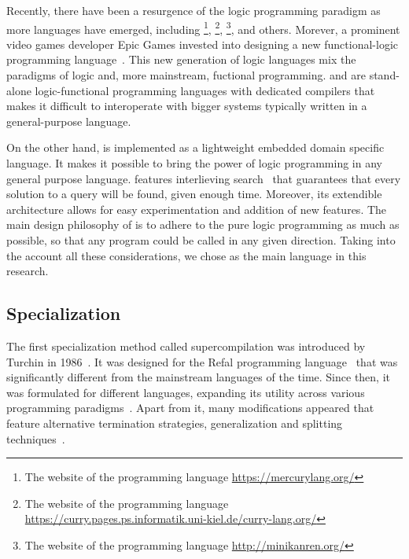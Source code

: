 Recently, there have been a resurgence of the logic programming paradigm as more  languages have emerged, including \merc\footnote{The website of the \merc programming language \url{https://mercurylang.org/}}, \curry\footnote{The website of the \curry programming language \url{https://curry.pages.ps.informatik.uni-kiel.de/curry-lang.org/}}, \mk\footnote{The website of the \mk programming language \url{http://minikanren.org/}}, and others.
Morever, a prominent video games developer Epic Games invested into designing a new functional-logic programming language~\cite{versecalculus}.
This new generation of logic languages mix the paradigms of logic and, more mainstream, fuctional programming. 
\merc and \curry are stand-alone logic-functional programming languages with dedicated compilers that makes it difficult to interoperate with bigger systems typically written in a general-purpose language. 

On the other hand, \mk is implemented as a lightweight embedded domain specific language.
It makes it possible to bring the power of logic programming in any general purpose language. 
\mk features interlieving search~\cite{kiselyov2005backtracking} that guarantees that every solution to a query will be found, given enough time. 
Moreover, its extendible architecture allows for easy experimentation and addition of new features. 
The main design philosophy of \mk is to adhere to the pure logic programming as much as possible, so that any program could be called in any given direction. 
Taking into the account all these considerations, we chose \mk as the main language in this research. 

\subsection{Specialization}

The first specialization method called supercompilation was introduced by Turchin in 1986~\cite{turchin1986concept}.
It was designed for the Refal programming language~\cite{turchin1989refal} that was significantly different from the mainstream languages of the time.
Since then, it was formulated for different languages, expanding its utility across various programming paradigms~\cite{klyuchnikov2009supercompiler,mitchell2010rethinking}.
Apart from it, many modifications appeared that feature alternative termination strategies, generalization and splitting techniques~\cite{leuschel2002homeomorphic,sorensen1995algorithm,turchin1988algorithm}. 

